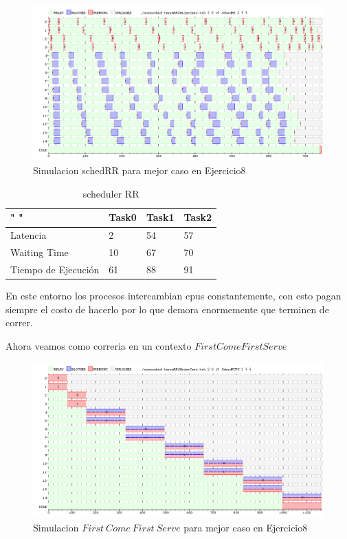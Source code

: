 \documentclass[11pt]{article}
\begin{document}
\begin{enumerate}
    \begin{figure}[H]
      \includegraphics[scale=0.5]{Ej8MejorCasoRR}
      \caption{Simulacion schedRR para mejor caso en Ejercicio8}
    \end{figure}

  \begin{table}[htb]
  \centering
  \begin{tabular}{| l | l | l | l |}
  \hline
  " " & Task0 & Task1 & Task2 \\
  \hline \hline
  Latencia & 2 & 54 & 57 \\ \hline
  Waiting Time & 10 & 67 & 70 \\ \hline
  Tiempo de Ejecución & 61 & 88 & 91 \\ \hline
  \end{tabular}
  \caption{scheduler RR}
  \end{table}


  En este entorno los procesos intercambian cpus constantemente, con esto pagan siempre el costo de hacerlo por lo que demora enormemente que terminen de correr.

  Ahora veamos como correria en un contexto $FirstComeFirstServe$


    \begin{figure}[H]
      \includegraphics[scale=0.5]{Ej8MejorCasoFCFS}
      \caption{Simulacion $First\ Come\ First\ Serve$ para mejor caso en Ejercicio8}
    \end{figure}


\end{enumerate}
\end{document}
